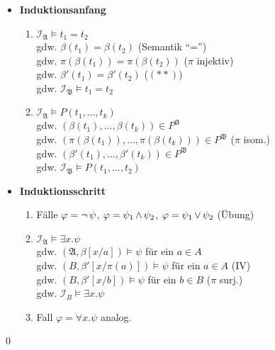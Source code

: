 \begin{itemize}
  \item \textbf{Induktionsanfang}
  \begin{enumerate}
    \item $\mathcal{I}_\mathfrak{A} \models t_1=t_2$\\
      gdw. $\beta(t_1) = \beta(t_2)$ (Semantik \enquote{=})\\
      gdw. $\pi(\beta(t_1)) = \pi(\beta(t_2))$ ($\pi$ injektiv)\\
      gdw. $\beta'(t_1) = \beta'(t_2)$ ($(**)$)\\
      gdw. $\mathcal{I}_\mathfrak{B} \models t_1=t_2$
    
    \item $\mathcal{I}_\mathfrak{A} \models P(t_1,\dots,t_k)$ \\
      gdw. $(\beta(t_1),\dots,\beta(t_k)) \in P^\mathfrak{A}$ \\
      gdw. $(\pi(\beta(t_1)),\dots,\pi(\beta(t_k))) \in P^\mathfrak{B}$ ($\pi$ isom.) \\
      gdw. $(\beta'(t_1),\dots,\beta'(t_k)) \in P^\mathfrak{B}$ \\
      gdw. $\mathcal{I}_\mathfrak{B} \models P(t_1,\dots,t_2)$
  \end{enumerate}
  
  \item \textbf{Induktionsschritt}
  \begin{enumerate}
    \item Fälle $\varphi = \operatorname{\neg} \psi$, $\varphi = \psi_1 \operatorname{\wedge} \psi_2$, $\varphi = \psi_1 \operatorname{\vee} \psi_2$
      (Übung)
      
    \item $\mathcal{I}_\mathfrak{A} \models \exists x.\psi$ \\
      gdw. $(\mathfrak{A}, \beta[x/a]) \models \psi$ für ein $a \in A$\\
      gdw. $(B, \beta'[x/\pi(a)]) \models \psi$ für ein $a \in A$ (IV)\\
      gdw. $(B, \beta'[x/b]) \models \psi$ für ein $b \in B$ ($\pi$ surj.)\\
      gdw. $\mathcal{I}_B \models \exists x.\psi$
      
    \item Fall $\varphi = \forall x.\psi$ analog.
  \end{enumerate}
\end{itemize}
\qed


